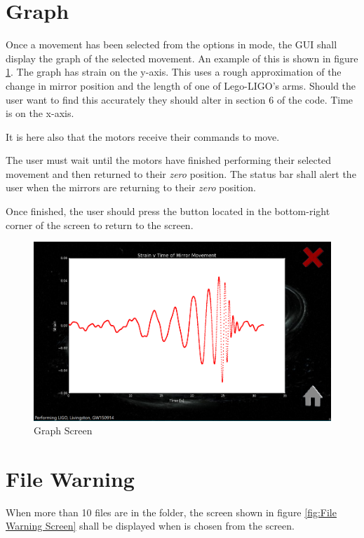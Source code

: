 \documentclass[a4paper, 12pt]{book}
\begin{document}
\section{Graph}
Once a movement has been selected from the options in  mode, the GUI shall display the graph of the selected movement. An example of this is shown in figure \ref{fig:Graph Screen}. The graph has strain on the y-axis. This uses a rough approximation of the change in mirror position and the length of one of Lego-LIGO's arms. Should the user want to find this accurately they should alter  in section 6 of the code. Time is on the x-axis.

It is here also that the motors receive their commands to move.

The user must wait until the motors have finished performing their selected movement and then returned to their \textit{zero} position. The status bar shall alert the user when the mirrors are returning to their \textit{zero} position.

Once finished, the user should press the  button located in the bottom-right corner of the screen to return to the  screen.
\begin{figure}[ht]
\centering
\includegraphics[width=120mm]{Graph_Screen.png}
\caption{Graph Screen}
\label{fig:Graph Screen}
\end{figure}

\section{File Warning}
When more than 10 files are in the  folder, the screen shown in figure \ref{fig:File Warning Screen} shall be displayed when  is chosen from the  screen.
\end{document}
